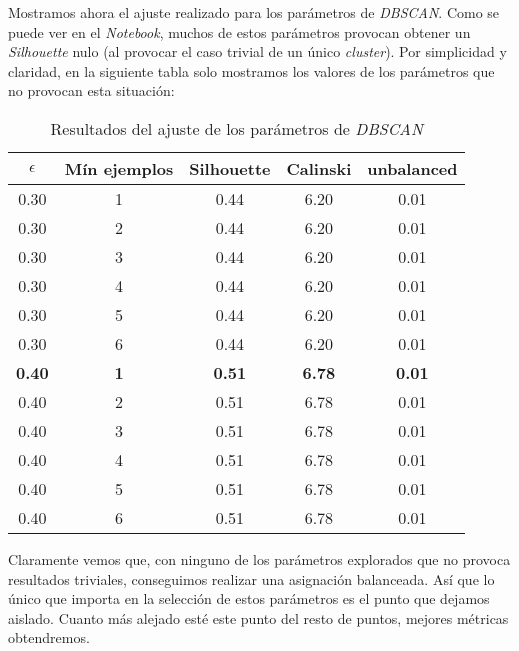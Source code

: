 \documentclass[11pt]{article}
\begin{document}
Mostramos ahora el ajuste realizado para los parámetros de \emph{DBSCAN}. Como se puede ver en el \emph{Notebook}, muchos de estos parámetros provocan obtener un \emph{Silhouette} nulo (al provocar el caso trivial de un único \emph{cluster}). Por simplicidad y claridad, en la siguiente tabla solo mostramos los valores de los parámetros que no provocan esta situación:


\begin{table}[H]
\begin{center}
    \begin{tabular}{|c|c|c|c|c|}
        \hline
            $\epsilon$ & Mín ejemplos & Silhouette & Calinski & unbalanced \\
        \hline

            0.30 & 1 &  0.44 &  6.20 &  0.01 \\
            0.30 & 2 &  0.44 &  6.20 &  0.01 \\
            0.30 & 3 &  0.44 &  6.20 &  0.01 \\
            0.30 & 4 &  0.44 &  6.20 &  0.01 \\
            0.30 & 5 &  0.44 &  6.20 &  0.01 \\
            0.30 & 6 &  0.44 &  6.20 &  0.01 \\
            \textbf{0.40} & \textbf{1} &  \textbf{0.51} &  \textbf{6.78} &  \textbf{0.01} \\
            0.40 & 2 &  0.51 &  6.78 &  0.01 \\
            0.40 & 3 &  0.51 &  6.78 &  0.01 \\
            0.40 & 4 &  0.51 &  6.78 &  0.01 \\
            0.40 & 5 &  0.51 &  6.78 &  0.01 \\
            0.40 & 6 &  0.51 &  6.78 &  0.01 \\

        \hline
    \end{tabular}
\end{center}
    \caption{Resultados del ajuste de los parámetros de \emph{DBSCAN}}
    \label{resultados_stcase01:tabla}
\end{table}

Claramente vemos que, con ninguno de los parámetros explorados que no provoca resultados triviales, conseguimos realizar una asignación balanceada. Así que lo único que importa en la selección de estos parámetros es el punto que dejamos aislado. Cuanto más alejado esté este punto del resto de puntos, mejores métricas obtendremos.
\end{document}
